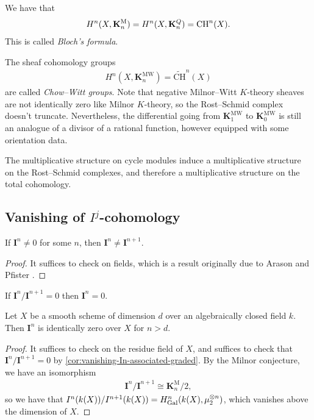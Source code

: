 \documentclass[11pt,openany]{book}
\providecommand{\KM}{\mathbf{K}^\mathrm{M}}
\providecommand{\KMW}{\mathbf{K}^\mathrm{MW}}
\providecommand{\CHW}{\widetilde{\mathrm{CH}}}
\begin{document}
\begin{corollary}\label{cor:blochs-formula} We have that
\begin{align*}
    H^n(X,\KM_n) = H^n(X, \mathbf{K}^Q_n) = \CH^n(X).
\end{align*}
This is called \emph{Bloch's formula}.
\end{corollary}


\begin{definition} The sheaf cohomology groups
\begin{align*}
    H^n(X, \KMW_n) = \CHW^n(X)
\end{align*}
are called \textit{Chow--Witt groups}. Note that negative Milnor--Witt $K$-theory sheaves are not identically zero like Milnor $K$-theory, so the Rost--Schmid complex doesn't truncate. Nevertheless, the differential going from $\KMW_1$ to $\KMW_0$ is still an analogue of a divisor of a rational function, however equipped with some orientation data.
\end{definition}

\begin{remark} The multiplicative structure on cycle modules induce a multiplicative structure on the Rost--Schmid complexes, and therefore a multiplicative structure on the total cohomology.
\end{remark}




\subsection{Vanishing of $I^j$-cohomology}

\begin{proposition} If $\mathbf{I}^n \ne 0$ for some $n$, then $\mathbf{I}^n \ne \mathbf{I}^{n+1}$.
\end{proposition}
\begin{proof} It suffices to check on fields, which is a result originally due to Arason and Pfister \cite[Korollar~2]{ArasonPfister}.
\end{proof}

\begin{corollary}\label{cor:vanishing-In-associated-graded} 
If $\mathbf{I}^n / \mathbf{I}^{n+1} = 0$ then $\mathbf{I}^n = 0$.
\end{corollary}




\begin{theorem} Let $X$ be a smooth scheme of dimension $d$ over an algebraically closed field $k$. Then $\mathbf{I}^{n}$ is identically zero over $X$ for $n>d$.
\end{theorem}
\begin{proof} It suffices to check on the residue field of $X$, and suffices to check that $\mathbf{I}^n/\mathbf{I}^{n+1} = 0$ by \autoref{cor:vanishing-In-associated-graded}. By the Milnor conjecture, we have an isomorphism
\begin{align*}
    \mathbf{I}^n/\mathbf{I}^{n+1} \cong \KM_n/2,
\end{align*}
so we have that $I^n(k(X))/I^{n+1}(k(X)) = H^n_{\mathrm{Gal}}(k(X), \mu_2^{\otimes n})$, which vanishes above the dimension of $X$. 
\end{proof}
\end{document}
